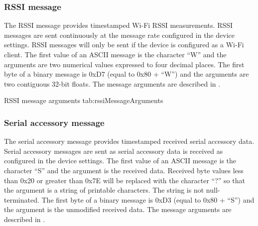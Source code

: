 \begingroup
    \def\tempNameA{Percentage}
    \def\tempNameB{Voltage}
    \def\tempNameC{Charging status}
    \def\tempValueA{100}
    \def\tempValueB{4.2}
    \def\tempValueC{2}
    \def\tempAsciiFirst{B}
    \def\tempAsciiA{100.0000}
    \def\tempAsciiB{4.2000}
    \def\tempAsciiC{2.0000}
    \def\tempBinaryFirst{C2}
    \def\tempBinaryA{00 00 C8 42}
    \def\tempBinaryB{66 66 86 40}
    \def\tempBinaryC{00 00 00 40}
    \dataMessageExample
\endgroup

\subsubsection{\acs{RSSI} message}

The \ac{RSSI} message provides timestamped Wi-Fi \ac{RSSI} measurements.  \ac{RSSI} messages are sent continuously at the message rate configured in the device settings.  \ac{RSSI} messages will only be sent if the device is configured as a Wi-Fi client.  The first value of an \ac{ASCII} message is the character \enquote{W} and the arguments are two numerical values expressed to four decimal places.  The first byte of a binary message is 0xD7 (equal to 0x80 + \enquote{W}) and the arguments are two contiguous 32-bit floats.  The message arguments are described in .

\begingroup
    \def\tempArgumentA{\acs{RSSI} percentage}
    \def\tempArgumentB{\acs{RSSI} power in dBm}
    \dataMessageTable
    {\acs{RSSI} message arguments}
    {tab:rssiMessageArguments}
\endgroup

\begingroup
    \def\tempNameA{\acs{RSSI} percentage}
    \def\tempNameB{\acs{RSSI} power}
    \def\tempValueA{100}
    \def\tempValueB{-50}
    \def\tempAsciiFirst{W}
    \def\tempAsciiA{100.000}
    \def\tempAsciiB{-50.0000}
    \def\tempBinaryFirst{D7}
    \def\tempBinaryA{00 00 C8 42}
    \def\tempBinaryB{00 00 48 C2}
    \dataMessageExample
\endgroup

\subsubsection{Serial accessory message}

The serial accessory message provides timestamped received serial accessory data.  Serial accessory messages are sent as serial accessory data is received as configured in the device settings.  The first value of an \ac{ASCII} message is the character \enquote{S} and the argument is the received data.  Received byte values less than 0x20 or greater than 0x7E will be replaced with the character \enquote{?} so that the argument is a string of printable characters.  The string is not null-terminated.  The first byte of a binary message is 0xD3 (equal to 0x80 + \enquote{S}) and the argument is the unmodified received data.  The message arguments are described in .

